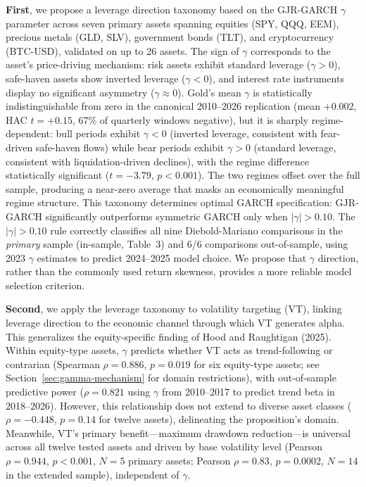 \textbf{First}, we propose a leverage direction taxonomy based on the GJR-GARCH $\gamma$ parameter across seven primary assets spanning equities (SPY, QQQ, EEM), precious metals (GLD, SLV), government bonds (TLT), and cryptocurrency (BTC-USD), validated on up to 26 assets. The sign of $\gamma$ corresponds to the asset's price-driving mechanism: risk assets exhibit standard leverage ($\gamma > 0$), safe-haven assets show inverted leverage ($\gamma < 0$), and interest rate instruments display no significant asymmetry ($\gamma \approx 0$). Gold's mean $\gamma$ is statistically indistinguishable from zero in the canonical 2010--2026 replication (mean $+0.002$, HAC $t = +0.15$, 67\% of quarterly windows negative), but it is sharply regime-dependent: bull periods exhibit $\gamma < 0$ (inverted leverage, consistent with fear-driven safe-haven flows) while bear periods exhibit $\gamma > 0$ (standard leverage, consistent with liquidation-driven declines), with the regime difference statistically significant ($t = -3.79$, $p < 0.001$). The two regimes offset over the full sample, producing a near-zero average that masks an economically meaningful regime structure. This taxonomy determines optimal GARCH specification: GJR-GARCH significantly outperforms symmetric GARCH only when $|\gamma| > 0.10$. The $|\gamma| > 0.10$ rule correctly classifies all nine Diebold-Mariano comparisons in the \emph{primary} sample (in-sample, Table~3) and 6/6 comparisons out-of-sample, using 2023 $\gamma$ estimates to predict 2024--2025 model choice. We propose that $\gamma$ direction, rather than the commonly used return skewness, provides a more reliable model selection criterion. %

\textbf{Second}, we apply the leverage taxonomy to volatility targeting (VT), linking leverage direction to the economic channel through which VT generates alpha. This generalizes the equity-specific finding of Hood and Raughtigan (2025). Within equity-type assets, $\gamma$ predicts whether VT acts as trend-following or contrarian (Spearman $\rho = 0.886$, $p = 0.019$ for six equity-type assets; see Section~\ref{sec:gamma-mechanism} for domain restrictions), with out-of-sample predictive power ($\rho = 0.821$ using $\gamma$ from 2010--2017 to predict trend beta in 2018--2026). However, this relationship does not extend to diverse asset classes ($\rho = -0.448$, $p = 0.14$ for twelve assets), delineating the proposition's domain. Meanwhile, VT's primary benefit---maximum drawdown reduction---is universal across all twelve tested assets and driven by base volatility level (Pearson $\rho = 0.944$, $p < 0.001$, $N = 5$ primary assets; Pearson $\rho = 0.83$, $p = 0.0002$, $N = 14$ in the extended sample), independent of $\gamma$. %

